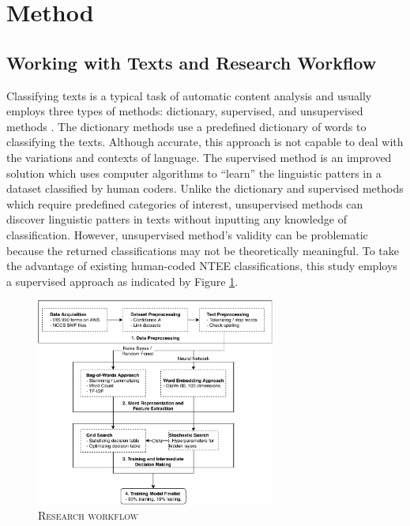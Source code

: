 \documentclass[11pt]{article}
\begin{document}


\section{Method}

\subsection{Working with Texts and Research Workflow}

Classifying texts is a typical task of automatic content analysis and usually employs three types of methods: dictionary, supervised, and unsupervised methods \parencite[268-269]{GrimmerTextDataPromise2013}. The dictionary methods use a predefined dictionary of words to classifying the texts. Although accurate, this approach is not capable to deal with the variations and contexts of language. The supervised method is an improved solution which uses computer algorithms to ``learn'' the linguistic patters in a dataset classified by human coders. Unlike the dictionary and supervised methods which require predefined categories of interest, unsupervised methods can discover linguistic patters in texts without inputting any knowledge of classification. However, unsupervised method's validity can be problematic because the returned classifications may not be theoretically meaningful. To take the advantage of existing human-coded NTEE classifications, this study employs a supervised approach as indicated by Figure \ref{fig:workflow}.

\begin{figure}
	\centering
	\caption{\textsc{Research workflow}} \label{fig:workflow}
	\includegraphics[width=0.7\textwidth]{tbl_fig/ntee_classification.pdf}
\end{figure}
\end{document}
